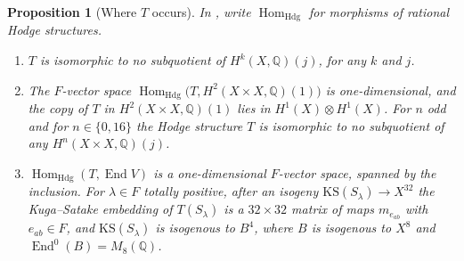 \documentclass[11pt,reqno]{amsart}
\theoremstyle{plain}
\newtheorem{proposition}[theorem]{Proposition}
\theoremstyle{definition}
\theoremstyle{remark}
\newcommand{\QQ}{\mathbb{Q}}
\DeclareMathOperator{\End}{End}
\DeclareMathOperator{\Hom}{Hom}
\begin{document}
\begin{proposition}[Where $T$ occurs]\label{prop:mumfordwhere}
In , write $\Hom_{\mathrm{Hdg}}$ for morphisms of rational
Hodge structures.
\begin{enumerate}[label=\textup{(\roman*)},nosep,leftmargin=2.6em]
\item $T$ is isomorphic to no subquotient of $H^{k}(X,\QQ)(j)$, for any $k$
  and $j$.
\item The $F$-vector space
  $\Hom_{\mathrm{Hdg}}\bigl(T,H^{2}(X\times X,\QQ)(1)\bigr)$ is
  one-dimensional, and the copy of $T$ in $H^{2}(X\times X,\QQ)(1)$ lies in
  $H^{1}(X)\otimes H^{1}(X)$. For $n$ odd and for $n\in\{0,16\}$ the Hodge
  structure $T$ is isomorphic to no subquotient of any
  $H^{n}(X\times X,\QQ)(j)$.
\item $\Hom_{\mathrm{Hdg}}(T,\End V)$ is a one-dimensional $F$-vector space,
  spanned by the inclusion. For $\lambda\in F$ totally positive, after an
  isogeny $\mathrm{KS}(S_{\lambda})\to X^{32}$ the Kuga--Satake embedding of
  $T(S_{\lambda})$ is a $32\times32$ matrix of maps $m_{e_{ab}}$ with
  $e_{ab}\in F$, and $\mathrm{KS}(S_{\lambda})$ is isogenous to $B^{4}$, where
  $B$ is isogenous to $X^{8}$ and $\End^{0}(B)=M_{8}(\QQ)$.
\end{enumerate}
\end{proposition}
\end{document}

